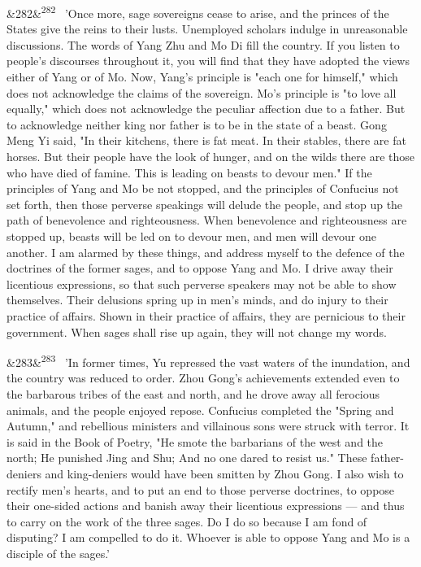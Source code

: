 \documentclass[12pt]{article}
\newcommand{\para}[1][]{\par\noindent\ifx&#1&\else\textsuperscript{\footnotesize #1}~\fi}
\begin{document}
\para[282] 'Once more, sage sovereigns cease to arise, and the princes of the States give the reins to their lusts. Unemployed scholars indulge in unreasonable discussions. The words of Yang Zhu and Mo Di fill the country. If you listen to people's discourses throughout it, you will find that they have adopted the views either of Yang or of Mo. Now, Yang's principle is "each one for himself," which does not acknowledge the claims of the sovereign. Mo's principle is "to love all equally," which does not acknowledge the peculiar affection due to a father. But to acknowledge neither king nor father is to be in the state of a beast. Gong Meng Yi said, "In their kitchens, there is fat meat. In their stables, there are fat horses. But their people have the look of hunger, and on the wilds there are those who have died of famine. This is leading on beasts to devour men." If the principles of Yang and Mo be not stopped, and the principles of Confucius not set forth, then those perverse speakings will delude the people, and stop up the path of benevolence and righteousness. When benevolence and righteousness are stopped up, beasts will be led on to devour men, and men will devour one another. I am alarmed by these things, and address myself to the defence of the doctrines of the former sages, and to oppose Yang and Mo. I drive away their licentious expressions, so that such perverse speakers may not be able to show themselves. Their delusions spring up in men's minds, and do injury to their practice of affairs. Shown in their practice of affairs, they are pernicious to their government. When sages shall rise up again, they will not change my words.

\para[283] 'In former times, Yu repressed the vast waters of the inundation, and the country was reduced to order. Zhou Gong's achievements extended even to the barbarous tribes of the east and north, and he drove away all ferocious animals, and the people enjoyed repose. Confucius completed the "Spring and Autumn," and rebellious ministers and villainous sons were struck with terror. It is said in the Book of Poetry, "He smote the barbarians of the west and the north; He punished Jing and Shu; And no one dared to resist us." These father-deniers and king-deniers would have been smitten by Zhou Gong. I also wish to rectify men's hearts, and to put an end to those perverse doctrines, to oppose their one-sided actions and banish away their licentious expressions --- and thus to carry on the work of the three sages. Do I do so because I am fond of disputing? I am compelled to do it. Whoever is able to oppose Yang and Mo is a disciple of the sages.'
\end{document}
